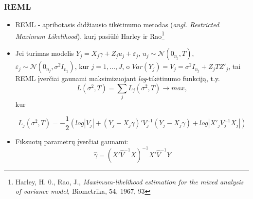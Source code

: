 \documentclass[utf8,hyperref={unicode,pdftex}]{beamer}
\begin{document}
\begin{frame}
\frametitle{REML}
\begin{itemize}
\item REML - apribotasis didžiausio tikėtinumo metodas (\textit{angl. Restricted Maximum Likelihood}), kurį pasiūlė Harley ir Rao\footnote{Harley, H. 0., Rao, J., \textit{Maximum-likelihood estimation for the mixed analysis of variance model}, Biometrika, 54, 1967, 93}\\
\item Jei turimas modelis $Y_j=X_j\gamma+Z_ju_j+\varepsilon_j$, $u_j\sim \mathcal{N}(0_{n_j}, T)$, $\varepsilon_j\sim \mathcal{N}(0_{n_j}, \sigma^2 I_{n_j})$, kur $j=1,\dots,J$, o $Var(Y_j)=V_j=\sigma^2 I_{n_j} + Z_jTZ'_j$, tai REML įverčiai gaunami maksimizuojant \textit{log}-tikėtinumo funkciją, t.y.
\[
L(\sigma^2, T)=\sum_j L_j(\sigma^2, T) \to max,
\]
kur
\begin{small}
\[
L_j(\sigma^2, T)=-\frac{1}{2}\left( log|V_j|+(Y_j-X_j\gamma)'V_j^{-1}(Y_j-X_j\gamma)+log|X'_jV_j^{-1}X_j|\right)
\]
\end{small}
\item Fiksuotų parametrų įverčiai gaunami:
\[\hat{\gamma}=(X'\hat{V}^{-1}X)^{-1}X'\hat{V}^{-1}Y\]
\end{itemize}
\end{frame}
\end{document}
